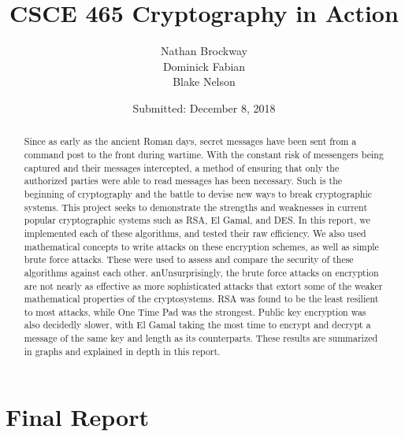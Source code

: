 \documentclass[12pt]{report}
\title{CSCE 465 Cryptography in Action}
\date{}
\begin{document}
\maketitle

\newpage
\author{Nathan Brockway\\Dominick Fabian\\Blake Nelson}
\date{Submitted: December 8, 2018}
\maketitle

\tableofcontents
\newpage

\begin{abstract}
    Since as early as the ancient Roman days, secret messages have been sent from a command post to the front during wartime. With the constant risk of messengers
    being captured and their messages intercepted, a method of ensuring that only the authorized parties were able to read messages has been necessary. Such is the
    beginning of cryptography and the battle to devise new ways to break cryptographic systems. This project seeks to demonstrate the strengths and weaknesses in
    current popular cryptographic systems such as RSA, El Gamal, and DES. In this report, we implemented each of these algorithms, and tested their raw efficiency.
    We also used mathematical concepts to write attacks on these encryption schemes, as well as simple brute force attacks. These were used to assess and compare
    the security of these algorithms against each other. anUnsurprisingly, the brute force attacks on encryption are not nearly as effective as more sophisticated
    attacks that extort some of the weaker mathematical properties of the cryptosystems. RSA was found to be the least resilient to most attacks, while One Time Pad
    was the strongest. Public key encryption was also decidedly slower, with El Gamal taking the most time to encrypt and decrypt a message of the same key and length
    as its counterparts. These results are summarized in graphs and explained in depth in this report.
\end{abstract}


\chapter{Final Report}
\end{document}
